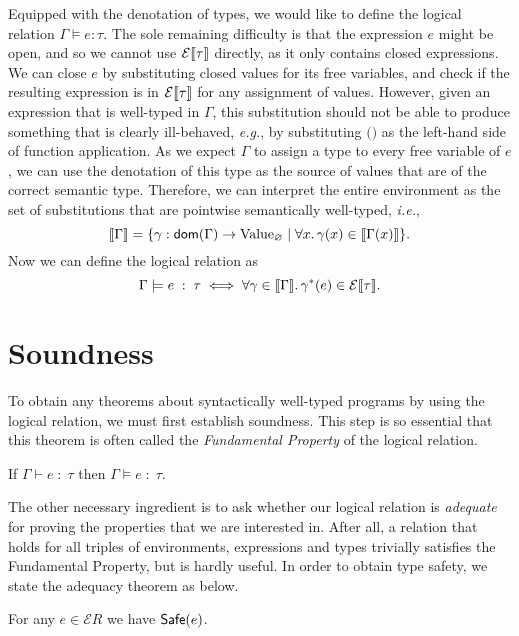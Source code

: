 Equipped with the denotation of types, we would like to define the logical
relation $\Gamma \models e : \tau$. The sole remaining difficulty is that the
expression $e$ might be open, and so we cannot use $\mathcal{E}\llbracket\tau\rrbracket$
directly, as it only contains closed expressions. We can close $e$ by
substituting closed values for its free variables, and check if the resulting
expression is in $\mathcal{E}\llbracket\tau\rrbracket$ for any assignment of values.
However, given an expression that is well-typed in $\Gamma$, this substitution
should not be able to produce something that is clearly ill-behaved,
\emph{e.g.}, by substituting $\texttt{()}$ as the left-hand side of function
application. As we expect $\Gamma$ to assign a type to every free variable of
$e$, we can use the denotation of this type as the source of values that are of
the correct semantic type. Therefore, we can interpret the entire environment
as the set of substitutions that are pointwise semantically well-typed,
\emph{i.e.},
\[
  \llbracket\Gamma\rrbracket = \{\gamma : \mathsf{dom}(\Gamma) \to \mathrm{Value}_{\varnothing}
    \mid \forall x\ldotp \gamma(x) \in \llbracket\Gamma(x)\rrbracket\}.
\]
Now we can define the logical relation as
\[
  \Gamma \models e \;:\; \tau \iff
   \forall \gamma \in \llbracket\Gamma\rrbracket\ldotp
   \gamma^*(e) \in \mathcal{E}\llbracket\tau\rrbracket.
\]

\section{Soundness}

To obtain any theorems about syntactically well-typed programs by using the
logical relation, we must first establish soundness. This step is so essential
that this theorem is often called the \emph{Fundamental Property} of the
logical relation.

\begin{theorem}
  If $\Gamma \vdash e \;:\; \tau$ then $\Gamma \models e \;:\; \tau$.
\end{theorem}

The other necessary ingredient is to ask whether our logical relation is
\emph{adequate} for proving the properties that we are interested in. After
all, a relation that holds for all triples of environments, expressions and
types trivially satisfies the Fundamental Property, but is hardly useful. In
order to obtain type safety, we state the adequacy theorem as below.

\begin{theorem}[Adequacy]
  For any $e \in \mathcal{E}R$ we have $\mathsf{Safe}(e)$.
\end{theorem}

